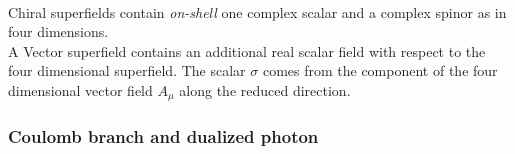 \\
Chiral superfields contain \emph{on-shell} one complex scalar and a complex spinor as in four dimensions.\\
A Vector superfield contains an additional real scalar field with respect to the four dimensional superfield.
The scalar $\sigma $ comes from the component of the four dimensional vector field $A_{\mu}$ along the reduced direction.









\subsubsection{Coulomb branch and dualized photon	}

